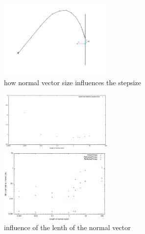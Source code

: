 \documentclass[twoside,twocolumn,11pt]{article} %
\begin{document}
\begin{figure}
	\includegraphics[width=0.5\textwidth]{figures/PrincipleNormIllu.pdf}
	\caption{how normal vector size influences the stepsize}
	\label{fig:normexpl}
\end{figure}
\begin{figure}
	\centering
	\begin{minipage}{\textwidth}
		\includegraphics[width=0.5\textwidth]{figures/NormVsTime.pdf}
	\end{minipage}
	\begin{minipage}{\textwidth}
		\includegraphics[width=0.5\textwidth]{figures/NormVsSigmaTime.pdf}
	\end{minipage}
\caption{influence of the lenth of the normal vector}
\label{fig:norminfl}
\end{figure}
\end{document}
